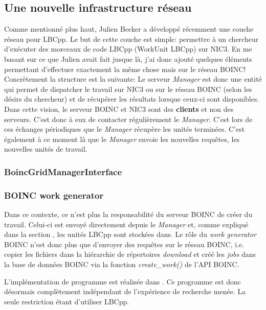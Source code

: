 \documentclass[a4paper, 11pt]{article}
\begin{document}
\subsection{Une nouvelle infrastructure réseau}
Comme mentionné plus haut, Julien Becker a développé récemment une couche réseau pour LBCpp. Le but de cette couche est simple: permettre à un chercheur d'exécuter des morceaux de code LBCpp (WorkUnit LBCpp) sur NIC3. En me basant sur ce que Julien avait fait jusque là, j'ai donc ajouté quelques éléments permettant d'effectuer exactement la même chose mais sur le réseau \textsc{BOINC}!
Concrètement la structure est la suivante:
Le serveur \textit{Manager} est donc une entité qui permet de dispatcher le travail sur NIC3 ou sur le réseau \textsc{BOINC} (selon les désirs du chercheur) et de récupérer les résultats lorsque ceux-ci sont disponibles. Dans cette vision, le serveur \textsc{BOINC} et NIC3 sont des \textbf{clients} et non des serveurs. C'est donc à eux de contacter régulièrement le \textit{Manager}. C'est lors de ces échanges périodiques que le \textit{Manager} récupère les unités terminées. C'est également à ce moment là que le \textit{Manager} envoie les nouvelles requêtes, les nouvelles unités de travail.

\subsubsection{BoincGridManagerInterface}


\subsubsection{BOINC work generator}
Dans ce contexte, ce n'est plus la responsabilité du serveur \textsc{BOINC} de créer du travail. Celui-ci est envoyé directement depuis le \textit{Manager} et, comme expliqué dans la section %
, les unités LBCpp sont stockées dans. %
Le rôle du \textit{work generator} \textsc{BOINC} n'est donc plus que d'envoyer des requêtes sur le réseau \textsc{BOINC}, i.e. copier les fichiers dans la hiérarchie de répertoires \textit{download} et créé les \textit{jobs} dans la base de données \textsc{BOINC} via la fonction \textit{create\_work()} de l'API \textsc{BOINC}. 

L'implémentation de programme est réalisée dans .%
Ce programme est donc désormais complètement indépendant de l'expérience de recherche menée. La seule restriction étant d'utiliser LBCpp.
\end{document}
